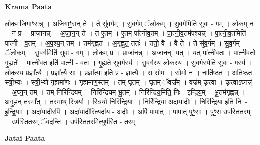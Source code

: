 \documentclass[17pt]{extarticle}
\begin{document}
\textbf{Krama Paata} \newline

लो॒कम॑जिगाꣳसन्न् । अ॒जि॒गाꣳ॒॒स॒न् ते । ते सु॑व॒र्गम् । सु॒व॒र्गम् ॅलो॒कम् । सु॒व॒र्गमिति॑ सुवः - गम् । लो॒कम् न । न प्र । प्राजा॑नन्न् । अ॒जा॒न॒न् ते । त ए॒तम् । ए॒तम् पा᳚त्नीव॒तम् । पा॒त्नी॒व॒तम॑पश्यन्न् । पा॒त्नी॒व॒तमिति॑ पात्नी - व॒तम् । अ॒प॒श्य॒न् तम् । तम॑गृह्णत । अ॒गृ॒ह्ण॒त॒ ततः॑ । ततो॒ वै । वै ते । ते सु॑व॒र्गम् । सु॒व॒र्गम् ॅलो॒कम् । सु॒व॒र्गमिति॑ सुवः - गम् । लो॒कम् प्र । प्राजा॑नन्न् । अ॒जा॒न॒न्॒. यत् । यत् पा᳚त्नीव॒तः । पा॒त्नी॒व॒तो गृ॒ह्यते᳚ । पा॒त्नी॒व॒त इति॑ पात्नी - व॒तः । गृ॒ह्यते॑ सुव॒र्गस्य॑ । सु॒व॒र्गस्य॑ लो॒कस्य॑ । सु॒व॒र्गस्येति॑ सुवः - गस्य॑ । लो॒कस्य॒ प्रज्ञा᳚त्यै । प्रज्ञा᳚त्यै॒ सः । प्रज्ञा᳚त्या॒ इति॒ प्र - ज्ञा॒त्यै॒ । स सोमः॑ । सोमो॒ न । नाति॑ष्ठत । अ॒ति॒ष्ठ॒त॒ स्त्री॒भ्यः । स्त्री॒भ्यो गृ॒ह्यमा॑णः । गृ॒ह्यमा॑ण॒स्तम् । तम् घृ॒तम् । घृ॒तम् ॅवज्र᳚म् । वज्र॑म् कृ॒त्वा । कृ॒त्वाऽघ्नन्न्॑ । अ॒घ्न॒न् तम् । तम् निरि॑न्द्रियम् । निरि॑न्द्रियम् भू॒तम् । निरि॑न्द्रिय॒मिति॒ निः - इ॒न्द्रि॒य॒म् । भू॒तम॑गृह्णन्न् । अ॒गृ॒ह्ण॒न् तस्मा᳚त् । तस्मा॒थ् स्त्रियः॑ । स्त्रियो॒ निरि॑न्द्रियाः । निरि॑न्द्रिया॒ अदा॑यादीः । निरि॑न्द्रिया॒ इति॒ निः - इ॒न्द्रि॒याः॒ । अदा॑यादी॒रपि॑ । अदा॑यादी॒रित्यदा॑य - अ॒दीः॒ । अपि॑ पा॒पात् । पा॒पात् पुꣳ॒॒सः । पुꣳ॒॒स उप॑स्तितरम् । उप॑स्तितरम् ॅवदन्ति । उप॑स्तितर॒मित्युप॑स्ति - त॒र॒म् \newline

\textbf{Jatai Paata} \newline
\end{document}
